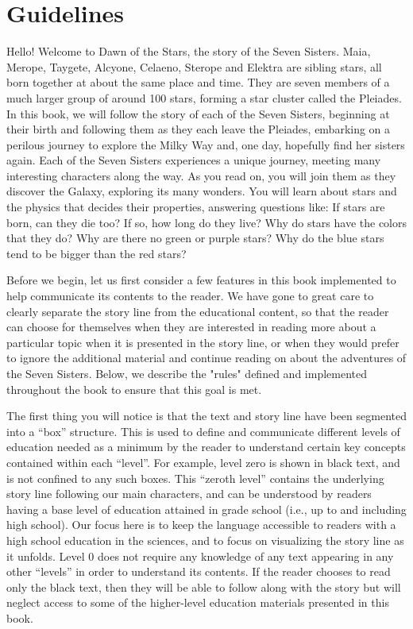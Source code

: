 \documentclass[main.tex]{subfiles}
\begin{document}
\section{Guidelines} \label{guide}

\par \nar Hello!  Welcome to Dawn of the Stars, the story of the Seven Sisters.  Maia, Merope, Taygete, Alcyone, Celaeno, Sterope and Elektra are sibling stars, all born together at about the same place and time.  They are seven members of a much larger group of around 100 stars, forming a star cluster called the Pleiades.  In this book, we will follow the story of each of the Seven Sisters, beginning at their birth and following them as they each leave the Pleiades, embarking on a perilous journey to explore the Milky Way and, one day, hopefully find her sisters again.  Each of the Seven Sisters experiences a unique journey, meeting many interesting characters along the way.  As you read on, you will join them as they discover the Galaxy, exploring its many wonders.  You will learn about stars and the physics that decides their properties, answering questions like:  If stars are born, can they die too?  If so, how long do they live?  Why do stars have the colors that they do?  Why are there no green or purple stars?  Why do the blue stars tend to be bigger than the red stars?  

\par \nar Before we begin, let us first consider a few features in this book implemented to help communicate its contents to the reader.  We have gone to great care to clearly separate the story line from the educational content, so that the reader can choose for themselves when they are interested in reading more about a particular topic when it is presented in the story line, or when they would prefer to ignore the additional material and continue reading on about the adventures of the Seven Sisters.  Below, we describe the "rules" defined and implemented throughout the book to ensure that this goal is met.

\par \nar The first thing you will notice is that the text and story line have been segmented into a “box” structure.  This is used to define and communicate different levels of education needed as a minimum by the reader to understand certain key concepts contained within each “level”.  For example, level zero is shown in black text, and is not confined to any such boxes.  This “zeroth level” contains the underlying story line following our main characters, and can be understood by readers having a base level of education attained in grade school (i.e., up to and including high school).  Our focus here is to keep the language accessible to readers with a high school education in the sciences, and to focus on visualizing the story line as it unfolds.  Level 0 does not require any knowledge of any text appearing in any other “levels” in order to understand its contents.  If the reader chooses to read only the black text, then they will be able to follow along with the story but will neglect access to some of the higher-level education materials presented in this book.  
\end{document}
